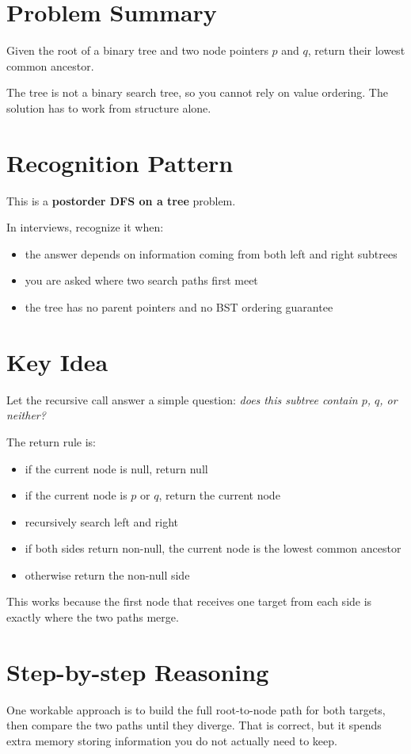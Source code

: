 \section{Problem Summary}
Given the root of a binary tree and two node pointers \(p\) and \(q\), return their lowest common ancestor.

The tree is not a binary search tree, so you cannot rely on value ordering. The solution has to work from structure alone.

\section{Recognition Pattern}
This is a \textbf{postorder DFS on a tree} problem.

In interviews, recognize it when:
\begin{itemize}
\item the answer depends on information coming from both left and right subtrees
\item you are asked where two search paths first meet
\item the tree has no parent pointers and no BST ordering guarantee
\end{itemize}

\section{Key Idea}
Let the recursive call answer a simple question: \emph{does this subtree contain \(p\), \(q\), or neither?}

The return rule is:
\begin{itemize}
\item if the current node is null, return null
\item if the current node is \(p\) or \(q\), return the current node
\item recursively search left and right
\item if both sides return non-null, the current node is the lowest common ancestor
\item otherwise return the non-null side
\end{itemize}

This works because the first node that receives one target from each side is exactly where the two paths merge.

\section{Step-by-step Reasoning}
One workable approach is to build the full root-to-node path for both targets, then compare the two paths until they diverge. That is correct, but it spends extra memory storing information you do not actually need to keep.

